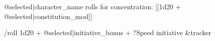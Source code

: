 @{selected|character_name} rolls for concentration: [[1d20 + @{selected|constitution_mod}]]

/roll 1d20 + @{selected|initiative_bonus} + ?{Speed initiative} &{tracker}
